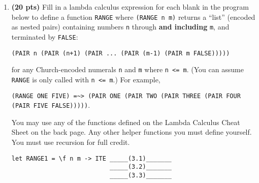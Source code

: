 \documentclass[paper=letter, fontsize=13pt]{article} %
\numberwithin{equation}{section} %
\newif\ifshowanswers\showanswerstrue
\begin{document}
\begin{enumerate}
\begin{enumerate}[label*=\arabic*.]
\ifshowanswers
Possible answer: 
\begin{itemize}
\item
\begin{verbatim}
(\n.(\a.\a.\b.a) n (\a.\b.a)) ((\x.x x) (\y.y y)) (\z.z)
=b> (\a.\a.\b.a) ((\x.x x) (\y.y y)) (\a.\b.a) (\z.z)
=b> (\a.\b.a) (\a.\b.a) (\z.z)
=b> (\b.\a.\b.a) (\z.z)
=b> \a.\b.a
\end{verbatim}
\end{itemize}
\else
  \framebox[0.90\textwidth]{\begin{minipage}[t][35em]{0.90\textwidth} \end{minipage}}
\fi
\end{enumerate}

\newpage

\item \textbf{(20 pts)} Fill in a lambda calculus expression for each blank in the program
  below to define a function \verb|RANGE| where \verb|(RANGE n m)| returns a ``list'' (encoded as
  nested pairs) containing numbers \verb|n| through \textbf{and including} \verb|m|,
  and terminated by \verb|FALSE|:

\verb|(PAIR n (PAIR (n+1) (PAIR ... (PAIR (m-1) (PAIR m FALSE)))))|

for any Church-encoded numerals \verb|n| and \verb|m| where \verb|n <= m|.  (You can assume \verb|RANGE| is only called
with \verb|n <= m|.) For example,

\verb|(RANGE ONE FIVE) =~> (PAIR ONE (PAIR TWO (PAIR THREE (PAIR FOUR (PAIR FIVE FALSE)))))|.

You may use any of the functions defined on the Lambda Calculus Cheat
Sheet on the back page.  Any other helper functions you must define
yourself.  You must use recursion for full credit.

\begin{verbatim}
let RANGE1 = \f n m -> ITE _____(3.1)_______
                           _____(3.2)_______
                           _____(3.3)_______
                      

\end{verbatim}
\end{enumerate}
\end{document}

